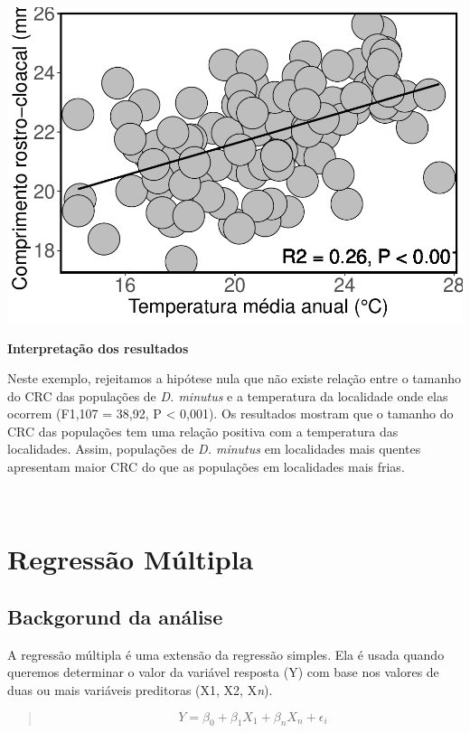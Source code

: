 \documentclass[
]{book}
\begin{document}
\includegraphics{livro_r_ecologia_files/figure-latex/unnamed-chunk-10-1.pdf}

\textbf{Interpretação dos resultados}

Neste exemplo, rejeitamos a hipótese nula que não existe relação entre o tamanho do CRC das populações de \emph{D. minutus} e a temperatura da localidade onde elas ocorrem (F1,107 = 38,92, P \textless{} 0,001). Os resultados mostram que o tamanho do CRC das populações tem uma relação positiva com a temperatura das localidades. Assim, populações de \emph{D. minutus} em localidades mais quentes apresentam maior CRC do que as populações em localidades mais frias.

~

\hypertarget{regressuxe3o-muxfaltipla}{%
\section{Regressão Múltipla}\label{regressuxe3o-muxfaltipla}}

\hypertarget{backgorund-da-anuxe1lise-4}{%
\subsection{Backgorund da análise}\label{backgorund-da-anuxe1lise-4}}

A regressão múltipla é uma extensão da regressão simples. Ela é usada quando queremos determinar o valor da variável resposta (Y) com base nos valores de duas ou mais variáveis preditoras (X1, X2, X\emph{n}).

\begin{quote}
\[ Y = \beta_0 + \beta_{1}X_1 + \beta_{n}X_n + \epsilon_i \]
\end{quote}
\end{document}
